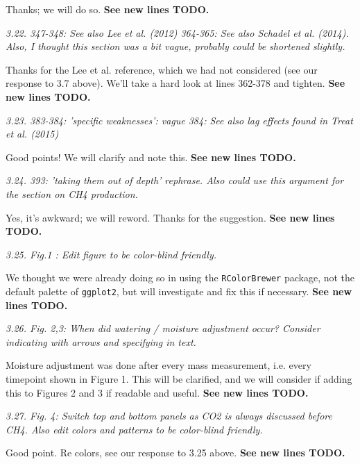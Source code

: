 \documentclass[11pt, oneside]{article}
\begin{document}
Thanks; we will do so. {\bf See new lines TODO.}

\medskip
{\it 3.22. 347-348: See also Lee et al. (2012)
364-365: See also Schadel et al. (2014). Also, I thought this section was a bit vague, probably could be shortened slightly. }

Thanks for the Lee et al. reference, which we had not considered (see our response to 3.7 above). We'll take a hard look at lines 362-378 and tighten. {\bf See new lines TODO.}

\medskip
{\it 3.23. 383-384: 'specific weaknesses': vague
384: See also lag effects found in Treat et al. (2015) }

Good points! We will clarify and note this. {\bf See new lines TODO.}

\medskip
{\it 3.24. 393: 'taking them out of depth' rephrase. Also could use this argument for the section on CH4 production. }

Yes, it's awkward; we will reword. Thanks for the suggestion. {\bf See new lines TODO.}

\medskip
{\it 3.25. Fig.1 : Edit figure to be color-blind friendly. }

We thought we were already doing so in using the {\tt RColorBrewer} package, not the default palette of {\tt ggplot2}, but will investigate and fix this if necessary. {\bf See new lines TODO.}

\medskip
{\it 3.26. Fig. 2,3: When did watering / moisture adjustment occur? Consider indicating with arrows and specifying in text. }

Moisture adjustment was done after every mass measurement, i.e. every timepoint shown in Figure 1. This will be clarified, and we will consider if adding this to Figures 2 and 3 if readable and useful. {\bf See new lines TODO.}

\medskip
{\it 3.27. Fig. 4: Switch top and bottom panels as CO2 is always discussed before CH4. Also edit colors and patterns to be color-blind friendly. }

Good point. Re colors, see our response to 3.25 above. {\bf See new lines TODO.}
\end{document}
